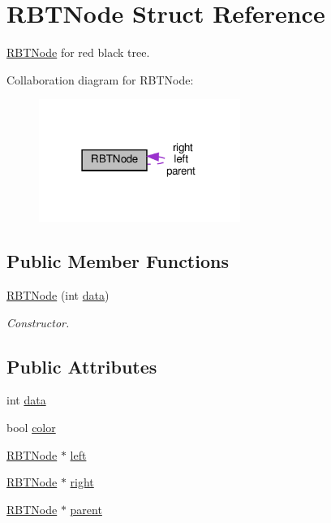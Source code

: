 \hypertarget{struct_r_b_t_node}{}\section{R\+B\+T\+Node Struct Reference}
\label{struct_r_b_t_node}


\hyperlink{struct_r_b_t_node}{R\+B\+T\+Node} for red black tree.  




Collaboration diagram for R\+B\+T\+Node\+:
\nopagebreak
\begin{figure}[H]
\begin{center}
\leavevmode
\includegraphics[width=186pt]{struct_r_b_t_node__coll__graph}
\end{center}
\end{figure}
\subsection*{Public Member Functions}
\begin{DoxyCompactItemize}
\item 
\hyperlink{struct_r_b_t_node_a0392480d9b347b937fed779ebfba204b}{R\+B\+T\+Node} (int \hyperlink{struct_r_b_t_node_a3d765df58677c77bf9e3743938d41d0d}{data})
\begin{DoxyCompactList}\small\item\em Constructor. \end{DoxyCompactList}\end{DoxyCompactItemize}
\subsection*{Public Attributes}
\begin{DoxyCompactItemize}
\item 
int \hyperlink{struct_r_b_t_node_a3d765df58677c77bf9e3743938d41d0d}{data}
\item 
bool \hyperlink{struct_r_b_t_node_a8e8fa974e4586ceb0883861952fde8e0}{color}
\item 
\hyperlink{struct_r_b_t_node}{R\+B\+T\+Node} $\ast$ \hyperlink{struct_r_b_t_node_ab365a258e6d393e3a2b1b876a72b57b8}{left}
\item 
\hyperlink{struct_r_b_t_node}{R\+B\+T\+Node} $\ast$ \hyperlink{struct_r_b_t_node_a56bcde7ab9200c37bcbeb736b7b3cd06}{right}
\item 
\hyperlink{struct_r_b_t_node}{R\+B\+T\+Node} $\ast$ \hyperlink{struct_r_b_t_node_accf38a2652c418128932b2f13283ba8c}{parent}
\end{DoxyCompactItemize}


